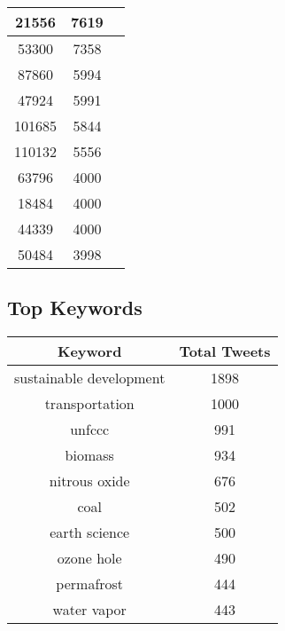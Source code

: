 \documentclass{article}\usepackage[T1]{fontenc}
\begin{document}
\begin{tabular}{|c|c|c|}
 \hline
21556 & 7619\\ 
 \hline
53300 & 7358\\ 
 \hline
87860 & 5994\\ 
 \hline
47924 & 5991\\ 
 \hline
101685 & 5844\\ 
 \hline
110132 & 5556\\ 
 \hline
63796 & 4000\\ 
 \hline
18484 & 4000\\ 
 \hline
44339 & 4000\\ 
 \hline
50484 & 3998\\ 
 \hline
\end{tabular}\subsection*{Top Keywords}\begin{tabular}{|c|c|}         \hline         Keyword & Total Tweets \\ 
 \hline
sustainable development & 1898\\ 
 \hline
transportation & 1000\\ 
 \hline
unfccc & 991\\ 
 \hline
biomass & 934\\ 
 \hline
nitrous oxide & 676\\ 
 \hline
coal & 502\\ 
 \hline
earth science & 500\\ 
 \hline
ozone hole & 490\\ 
 \hline
permafrost & 444\\ 
 \hline
water vapor & 443\\ 
 \hline
\end{tabular}
\end{document}
